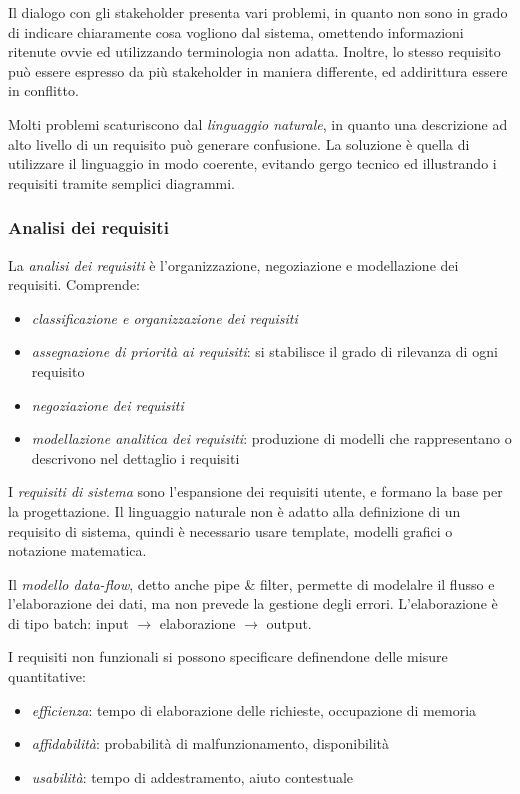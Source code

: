 \documentclass[11pt]{article}
\begin{document}
Il dialogo con gli stakeholder presenta vari problemi, in quanto non sono in grado di indicare chiaramente cosa vogliono 
dal sistema, omettendo informazioni ritenute ovvie ed utilizzando terminologia non adatta. Inoltre, lo stesso requisito 
può essere espresso da più stakeholder in maniera differente, ed addirittura essere in conflitto.

Molti problemi scaturiscono dal \textit{linguaggio naturale}, in quanto una descrizione ad alto livello di un requisito 
può generare confusione. La soluzione è quella di utilizzare il linguaggio in modo coerente, evitando gergo tecnico ed 
illustrando i requisiti tramite semplici diagrammi.
\subsubsection*{Analisi dei requisiti}
La \textit{analisi dei requisiti} è l'organizzazione, negoziazione e modellazione dei requisiti.
Comprende:
\begin{itemize}
    \item \textit{classificazione e organizzazione dei requisiti}
    \item \textit{assegnazione di priorità ai requisiti}: si stabilisce il grado di rilevanza di ogni requisito 
    \item \textit{negoziazione dei requisiti}
    \item \textit{modellazione analitica dei requisiti}: produzione di modelli che rappresentano o descrivono nel dettaglio 
    i requisiti 
\end{itemize}
I \textit{requisiti di sistema} sono l'espansione dei requisiti utente, e formano la base per la progettazione. Il linguaggio
naturale non è adatto alla definizione di un requisito di sistema, quindi è necessario usare template, modelli grafici o 
notazione matematica.

Il \textit{modello data-flow}, detto anche pipe \& filter, permette di modelalre il flusso e l'elaborazione dei dati, ma 
non prevede la gestione degli errori. L'elaborazione è di tipo batch: input $\rightarrow$ elaborazione $\rightarrow$ output.

I requisiti non funzionali si possono specificare definendone delle misure quantitative:
\begin{itemize}
    \item \textit{efficienza}: tempo di elaborazione delle richieste, occupazione di memoria
    \item \textit{affidabilità}: probabilità di malfunzionamento, disponibilità
    \item \textit{usabilità}: tempo di addestramento, aiuto contestuale
\end{itemize}
\end{document}
